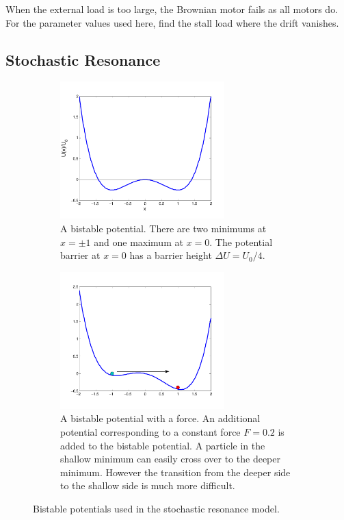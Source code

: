 \bigskip

\exercise When the external load is too large, the Brownian motor fails as all motors do.  For the parameter values used here, find the stall load where the drift vanishes.




\subsection{Stochastic Resonance}

\begin{figure}
	\centering
	\begin{subfigure}{0.45\textwidth}
		\centering
		\includegraphics[width=2.5in]{18.Langevin/bistable.pdf}
		\caption{A bistable potential. There are two minimums at $x=\pm 1$ and one maximum at $x=0$.  The potential barrier at $x=0$ has a barrier height $\Delta U = U_0/4$.}
		\label{fig:bistable}
	\end{subfigure}
	\begin{subfigure}{0.45\textwidth}
		\centering
		\includegraphics[width=2.5in]{18.Langevin/forced_bistable.pdf}		
		\caption{A bistable potential with a force. An additional potential corresponding to a constant force $F=0.2$ is added to the bistable potential.  A particle in the shallow minimum can easily cross over to the deeper minimum.  However the transition from the deeper side to the shallow side is much more difficult.}
		\label{fig:forced_bistable}
	\end{subfigure}
	\caption{Bistable potentials used in the stochastic resonance model.}
\end{figure}

